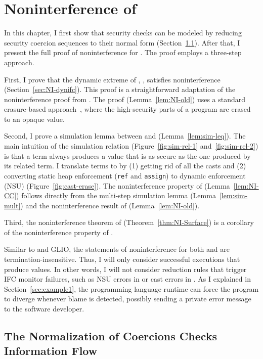 \chapter{Noninterference of \Surface}
\label{ch:noninterference}

In this chapter, I first show that security checks can be modeled by reducing
security coercion sequences to their normal form (Section~\ref{sec:norm-IF}).
After that, I present the full proof of noninterference for \Surface. The proof
employs a three-step approach.

First, I prove that the dynamic extreme of \Surface, \DynIFC, satisfies
noninterference (Section~\ref{sec:NI-dynifc}). This proof is a straightforward
adaptation of the noninterference proof from \textcite{Chen:2022aa}. The proof
(Lemma~\ref{lem:NI-old}) uses a standard erasure-based
approach~\parencite{LI20101974, stefan2011flexible, stefan2012flexible,
  Fennell:2013ab, STEFAN:2017ta}, where the high-security parts of a program are
erased to an opaque value.

Second, I prove a simulation lemma between \CC and \DynIFC
(Lemma~\ref{lem:sim-leq}). The main intuition of the simulation relation
(Figure~\ref{fig:sim-rel-1} and~\ref{fig:sim-rel-2}) is that a \CC term always
produces a value that is as secure as the one produced by its related \DynIFC
term. I translate \CC terms to \DynIFC by (1) getting rid of all the casts and
(2) converting static heap enforcement (\texttt{ref} and \texttt{assign}) to
dynamic enforcement (NSU) (Figure~\ref{fig:cast-erase}). The noninterference
property of \CC (Lemma~\ref{lem:NI-CC}) follows directly from the multi-step
simulation lemma (Lemma~\ref{lem:sim-mult}) and the noninterference result of
\DynIFC (Lemma~\ref{lem:NI-old}).

Third, the noninterference theorem of \Surface (Theorem~\ref{thm:NI-Surface}) is
a corollary of the noninterference property of \CC.

Similar to \GSLRef and GLIO, the statements of noninterference for
both \DynIFC and \CC are termination-insensitive.  Thus, I will only
consider successful executions that produce values. In other words,
I will not consider reduction rules that trigger IFC monitor failures,
such as NSU errors in \DynIFC or cast errors in \CC.  As I explained
in Section~\ref{sec:example1}, the programming language runtime can
force the program to diverge whenever blame is detected, possibly
sending a private error message to the software developer.

\section{The Normalization of Coercions Checks Information Flow}
\label{sec:norm-IF}


